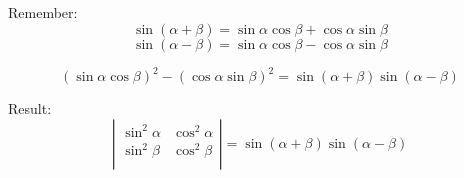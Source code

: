 \documentclass[a4paper, 10pt]{scrartcl}
\begin{document}
Remember:
\[\sin{(\alpha + \beta)} = \sin{\alpha}\cos{\beta} + \cos{\alpha}\sin{\beta}\]
\[\sin{(\alpha - \beta)} = \sin{\alpha}\cos{\beta} - \cos{\alpha}\sin{\beta}\]

\[
(\sin{\alpha}\cos{\beta})^{2} - (\cos{\alpha}\sin{\beta})^{2} =
\sin{(\alpha + \beta)}\sin{(\alpha - \beta)}
\]

Result:
\[
\left|
    \begin{array}{cc}
        \sin^{2}{\alpha} & \cos^{2}{\alpha}\\
        \sin^{2}{\beta}  & \cos^{2}{\beta}\\
    \end{array}
\right| =
\sin{(\alpha + \beta)}\sin{(\alpha - \beta)}
\]
\end{document}
